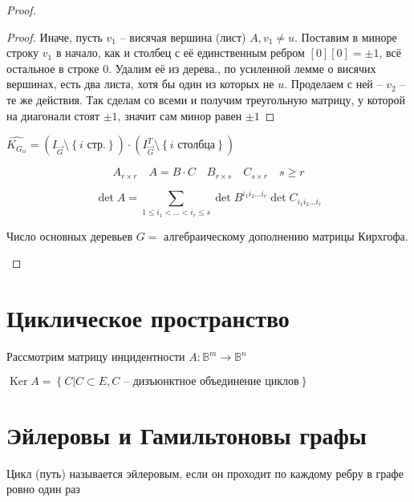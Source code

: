 \documentclass{book}
\theoremstyle{definition}
\DeclareMathOperator{\Ker}{Ker}
\begin{document}
\begin{proof}
\begin{proof}
            Иначе, пусть $v_1$ -- висячая вершина (лист)  $A, v_1\neq u$. Поставим в миноре строку $v_1$ в начало, как и столбец с её единственным ребром $[0][0] = \pm 1$, всё остальное в строке 0. Удалим её из дерева., по усиленной лемме о висячих вершинах, есть два листа, хотя бы один из которых не  $u$. Проделаем с ней --  $v_2$ -- те же действия. Так сделам со всеми и получим треугольную матрицу, у которой на диагонали стоят $\pm 1$, значит сам минор равен  $\pm 1$
        \end{proof}
        \begin{lemma}
            $\widehat{K_{G_{ii}}} = (I_{\vec G} \setminus  \left\{ i\text{ стр.} \right\})\cdot \left( I^T_{\vec G}\setminus \left\{ i \text{ столбца} \right\}  \right)  $
        \end{lemma}
        \begin{lemma}

        \[A_{r\times r}\quad A = B\cdot C\quad B_{r\times s}\quad C_{s\times r}\quad s \geqslant r\]

        \[\det A = \sum_{1\leqslant i_1<\ldots< i_r\leqslant s}\det B^{i_1i_2\ldots i_r}\det C_{i_1i_2\ldots i_r}\]
        \end{lemma}
        \begin{theorem}
            [lite]

            Число основных деревьев $G = $ алгебраическому дополнению матрицы Кирхгофа.
        \end{theorem}
    \end{proof}

    \section{Циклическое пространство}

    Рассмотрим матрицу инцидентности $A:\mathbb B^m \to \mathbb B^n$

    $\Ker A = \left\{ C|C\subset E, C \text{ -- дизъюнктное объединение циклов} \right\} $


    \section{Эйлеровы и Гамильтоновы графы}

    \begin{definition}
        Цикл (путь) называется эйлеровым, если он проходит по каждому ребру в графе ровно один раз

    \end{definition}
\end{document}
